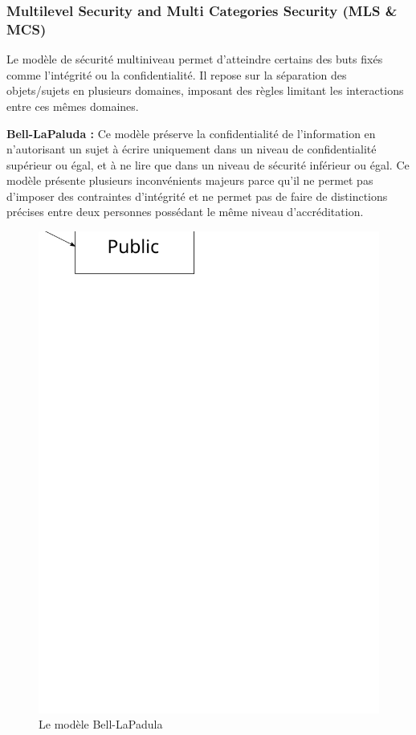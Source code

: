 \documentclass[pdftex,a4paper,titlepage,11pt]{article}
\begin{document}

\subsubsection{Multilevel Security and Multi Categories Security (MLS \& MCS)}

Le modèle de sécurité multiniveau permet d'atteindre certains des buts fixés comme l'intégrité ou la confidentialité. Il repose sur la séparation des objets/sujets en plusieurs domaines, imposant des règles limitant les interactions entre ces mêmes domaines.

\textbf{Bell-LaPaluda :} Ce modèle préserve la confidentialité de l'information en n'autorisant un sujet à écrire uniquement dans un niveau de confidentialité supérieur ou égal, et à ne lire que dans un niveau de sécurité inférieur ou égal. Ce modèle présente plusieurs inconvénients majeurs parce qu'il ne permet pas d'imposer des contraintes d'intégrité et ne permet pas de faire de distinctions précises entre deux personnes possédant le même niveau d'accréditation.

\begin{figure}[h]
	\centering
	\includegraphics[scale=0.5]{bell-lp}
	\caption{Le modèle Bell-LaPadula}
\end{figure}
\end{document}
